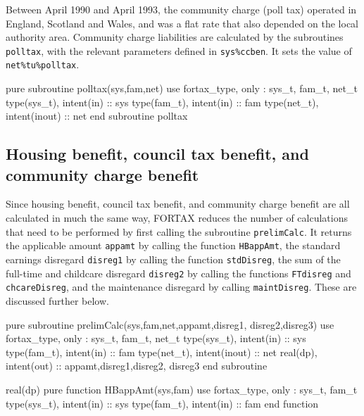 \documentclass[11pt,thmsa,letter,ukenglish]{article}
\begin{document}
Between April 1990 and April 1993, the community charge (poll tax) operated in England, Scotland and Wales, and was a flat rate that also depended on the local authority area. Community charge liabilities are calculated by the subroutines \texttt{polltax}, with the relevant parameters defined in \texttt{sys\%ccben}. It sets the value of \texttt{net\%tu\%polltax}.

\begin{fortrancode}
pure subroutine polltax(sys,fam,net)
    use fortax_type, only : sys_t, fam_t, net_t
    type(sys_t), intent(in)    :: sys
    type(fam_t), intent(in)    :: fam
    type(net_t), intent(inout) :: net
end subroutine polltax
\end{fortrancode}

\subsection[Housing, council tax, and community charge benefits]{Housing benefit, council tax benefit, and community charge benefit}

Since housing benefit, council tax benefit, and community charge benefit are all calculated in much the same way, FORTAX reduces the number of calculations that need to be performed by first calling the subroutine \texttt{prelimCalc}. It returns the applicable amount \texttt{appamt} by calling the function \texttt{HBappAmt}, the standard earnings disregard \texttt{disreg1} by calling the function \texttt{stdDisreg}, the sum of the full-time and childcare disregard \texttt{disreg2} by calling the functions \texttt{FTdisreg} and \texttt{chcareDisreg}, and the maintenance disregard by calling \texttt{maintDisreg}. These are discussed further below.

\begin{fortrancode}
pure subroutine prelimCalc(sys,fam,net,appamt,disreg1, disreg2,disreg3)
    use fortax_type, only : sys_t, fam_t, net_t
    type(sys_t), intent(in)    :: sys
    type(fam_t), intent(in)    :: fam
    type(net_t), intent(inout) :: net
    real(dp),    intent(out)   :: appamt,disreg1,disreg2, disreg3
end subroutine
\end{fortrancode}

\begin{fortrancode}
real(dp) pure function HBappAmt(sys,fam)
    use fortax_type, only : sys_t, fam_t
    type(sys_t), intent(in) :: sys
    type(fam_t), intent(in) :: fam
end function
\end{fortrancode}
\end{document}

